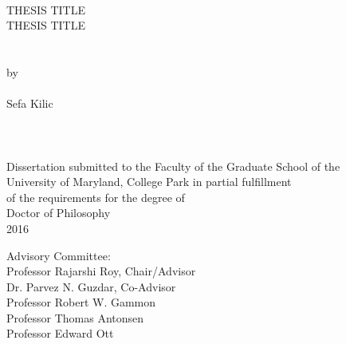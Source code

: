 
\thispagestyle{empty}
\hbox{\ }
\vspace{1in}
\renewcommand{\baselinestretch}{1}
\small\normalsize
\begin{center}

\large{{THESIS TITLE \\
THESIS TITLE}}\\
\ \\
\ \\
\large{by} \\
\ \\
\large{Sefa Kilic}%
\ \\
\ \\
\ \\
\ \\
\normalsize
Dissertation submitted to the Faculty of the Graduate School of the \\
University of Maryland, College Park in partial fulfillment \\
of the requirements for the degree of \\
Doctor of Philosophy \\
2016
\end{center}

\vspace{7.5em}

\noindent Advisory Committee: \\
Professor Rajarshi Roy, Chair/Advisor \\
Dr. Parvez N. Guzdar, Co-Advisor \\
Professor Robert W. Gammon \\
Professor Thomas Antonsen \\
Professor Edward Ott
